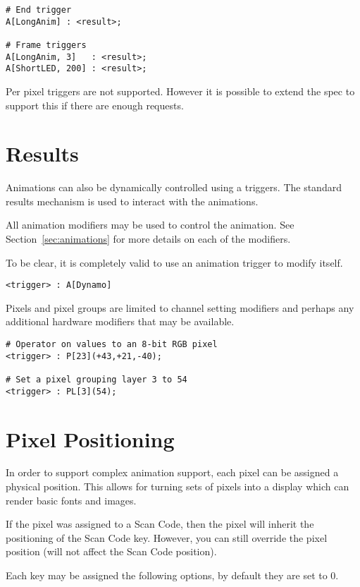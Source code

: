\documentclass{kiibohd-template}
\begin{document}
\begin{lstlisting}
# End trigger
A[LongAnim] : <result>;

# Frame triggers
A[LongAnim, 3]   : <result>;
A[ShortLED, 200] : <result>;
\end{lstlisting}

Per pixel triggers are not supported.
However it is possible to extend the spec to support this if there are enough requests.


\section{Results}

Animations can also be dynamically controlled using a triggers.
The standard results mechanism is used to interact with the animations.

All animation modifiers may be used to control the animation.
See Section~\ref{sec:animations} for more details on each of the modifiers.

To be clear, it is completely valid to use an animation trigger to modify itself.

\begin{lstlisting}
<trigger> : A[Dynamo]
\end{lstlisting}

Pixels and pixel groups are limited to channel setting modifiers and perhaps any additional hardware modifiers that may be available.

\begin{lstlisting}
# Operator on values to an 8-bit RGB pixel
<trigger> : P[23](+43,+21,-40);

# Set a pixel grouping layer 3 to 54
<trigger> : PL[3](54);
\end{lstlisting}


\section{Pixel Positioning}

In order to support complex animation support, each pixel can be assigned a physical position.
This allows for turning sets of pixels into a display which can render basic fonts and images.

If the pixel was assigned to a Scan Code, then the pixel will inherit the positioning of the Scan Code key.
However, you can still override the pixel position (will not affect the Scan Code position).

Each key may be assigned the following options, by default they are set to 0.
\end{document}
